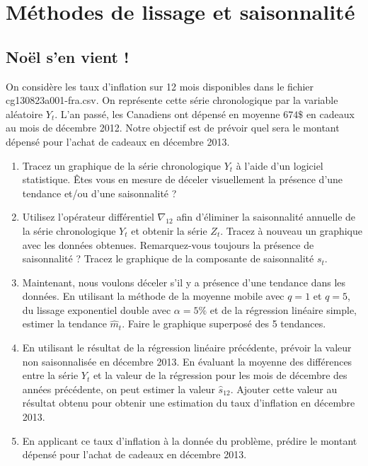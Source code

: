 \documentclass[11pt,english,francais]{article}
\begin{document}
\section{Méthodes de lissage et saisonnalité}
\label{sec:serie-dexercices-1}

\subsection{Noël s'en vient !}
\label{sec:exercice-1-1}

On considère les taux d'inflation sur 12 mois disponibles dans le
fichier cg130823a001-fra.csv. On représente cette série chronologique
par la variable aléatoire $Y_t$. L'an passé, les Canadiens ont dépensé
en moyenne $674\$$ en cadeaux au mois de décembre 2012. Notre objectif
est de prévoir quel sera le montant dépensé pour l'achat de cadeaux en
décembre 2013.

\begin{enumerate}
\item Tracez un graphique de la série chronologique $Y_t$ à l'aide
  d'un logiciel statistique. Êtes vous en mesure de déceler
  visuellement la présence d'une tendance et/ou d'une saisonnalité ?

\item Utilisez l'opérateur différentiel $\nabla_{12}$ afin d'éliminer
  la saisonnalité annuelle de la série chronologique $Y_t$ et obtenir
  la série $Z_t$. Tracez à nouveau un graphique avec les données
  obtenues. Remarquez-vous toujours la présence de saisonnalité ?
  Tracez le graphique de la composante de saisonnalité $s_t$.

\item Maintenant, nous voulons déceler s'il y a présence d'une
  tendance dans les données. En utilisant la méthode de la moyenne
  mobile avec $q=1$ et $q=5$, du lissage exponentiel double avec
  $\alpha=5\%$ et de la régression linéaire simple, estimer la
  tendance $\hat{m}_t$. Faire le graphique superposé des 5 tendances.

\item En utilisant le résultat de la régression linéaire précédente,
  prévoir la valeur non saisonnalisée en décembre 2013. En évaluant la
  moyenne des différences entre la série $Y_t$ et la valeur de la
  régression pour les mois de décembre des années précédente, on peut
  estimer la valeur $\hat{s}_{12}$. Ajouter cette valeur au résultat
  obtenu pour obtenir une estimation du taux d'inflation en décembre
  2013.

\item En applicant ce taux d'inflation à la donnée du problème,
  prédire le montant dépensé pour l'achat de cadeaux en décembre 2013.
\end{enumerate}
\end{document}
